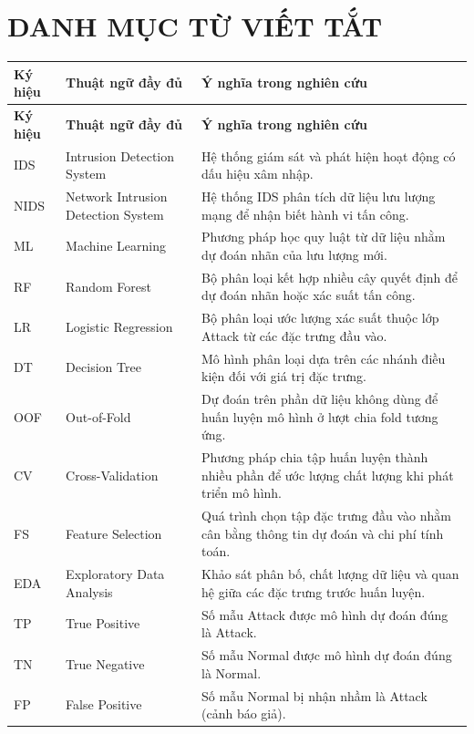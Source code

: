 \chapter*{DANH MỤC TỪ VIẾT TẮT}
\begin{longtable}{@{}p{.115\linewidth}p{.345\linewidth}p{.485\linewidth}@{}}
\toprule
\textbf{Ký hiệu} & \textbf{Thuật ngữ đầy đủ} & \textbf{Ý nghĩa trong nghiên cứu}\\
\midrule
\endfirsthead
\toprule
\textbf{Ký hiệu} & \textbf{Thuật ngữ đầy đủ} & \textbf{Ý nghĩa trong nghiên cứu}\\
\midrule
\endhead
IDS & Intrusion Detection System & Hệ thống giám sát và phát hiện hoạt động có dấu hiệu xâm nhập.\\
NIDS & Network Intrusion Detection System & Hệ thống IDS phân tích dữ liệu lưu lượng mạng để nhận biết hành vi tấn công.\\
ML & Machine Learning & Phương pháp học quy luật từ dữ liệu nhằm dự đoán nhãn của lưu lượng mới.\\
RF & Random Forest & Bộ phân loại kết hợp nhiều cây quyết định để dự đoán nhãn hoặc xác suất tấn công.\\
LR & Logistic Regression & Bộ phân loại ước lượng xác suất thuộc lớp Attack từ các đặc trưng đầu vào.\\
DT & Decision Tree & Mô hình phân loại dựa trên các nhánh điều kiện đối với giá trị đặc trưng.\\
OOF & Out-of-Fold & Dự đoán trên phần dữ liệu không dùng để huấn luyện mô hình ở lượt chia fold tương ứng.\\
CV & Cross-Validation & Phương pháp chia tập huấn luyện thành nhiều phần để ước lượng chất lượng khi phát triển mô hình.\\
FS & Feature Selection & Quá trình chọn tập đặc trưng đầu vào nhằm cân bằng thông tin dự đoán và chi phí tính toán.\\
EDA & Exploratory Data Analysis & Khảo sát phân bố, chất lượng dữ liệu và quan hệ giữa các đặc trưng trước huấn luyện.\\
TP & True Positive & Số mẫu Attack được mô hình dự đoán đúng là Attack.\\
TN & True Negative & Số mẫu Normal được mô hình dự đoán đúng là Normal.\\
FP & False Positive & Số mẫu Normal bị nhận nhầm là Attack (cảnh báo giả).\\

\end{longtable}
